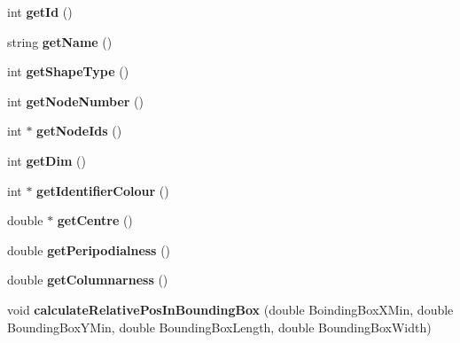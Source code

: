 \begin{DoxyCompactItemize}
\item 
\hypertarget{classShapeBase_ab55ac0089ea8e37649b0d85409c008ac}{}int {\bfseries get\+Id} ()\label{classShapeBase_ab55ac0089ea8e37649b0d85409c008ac}

\item 
\hypertarget{classShapeBase_a49d134532a98fb0cecacec44baf2baf3}{}string {\bfseries get\+Name} ()\label{classShapeBase_a49d134532a98fb0cecacec44baf2baf3}

\item 
\hypertarget{classShapeBase_a7ae6deee4256eb19c6e99b52a40847cb}{}int {\bfseries get\+Shape\+Type} ()\label{classShapeBase_a7ae6deee4256eb19c6e99b52a40847cb}

\item 
\hypertarget{classShapeBase_a46ce732af56537977ce6a34832440309}{}int {\bfseries get\+Node\+Number} ()\label{classShapeBase_a46ce732af56537977ce6a34832440309}

\item 
\hypertarget{classShapeBase_a55c283eaee304f9056089987e9b65012}{}int $\ast$ {\bfseries get\+Node\+Ids} ()\label{classShapeBase_a55c283eaee304f9056089987e9b65012}

\item 
\hypertarget{classShapeBase_ad60d92b34044153a677a8bfc0a31a5df}{}int {\bfseries get\+Dim} ()\label{classShapeBase_ad60d92b34044153a677a8bfc0a31a5df}

\item 
\hypertarget{classShapeBase_af10ec5e87cab16541c892712cf58c54d}{}int $\ast$ {\bfseries get\+Identifier\+Colour} ()\label{classShapeBase_af10ec5e87cab16541c892712cf58c54d}

\item 
\hypertarget{classShapeBase_ab26e6cbde2c8a4f326c32a38de48bcc7}{}double $\ast$ {\bfseries get\+Centre} ()\label{classShapeBase_ab26e6cbde2c8a4f326c32a38de48bcc7}

\item 
\hypertarget{classShapeBase_a90d1eaa5a49262418cee28284da14c16}{}double {\bfseries get\+Peripodialness} ()\label{classShapeBase_a90d1eaa5a49262418cee28284da14c16}

\item 
\hypertarget{classShapeBase_a44c758ac93865a1e51e63212ebfe2787}{}double {\bfseries get\+Columnarness} ()\label{classShapeBase_a44c758ac93865a1e51e63212ebfe2787}

\item 
\hypertarget{classShapeBase_a7d1235b3555a18328d1677e5b07458ff}{}void {\bfseries calculate\+Relative\+Pos\+In\+Bounding\+Box} (double Boinding\+Box\+X\+Min, double Bounding\+Box\+Y\+Min, double Bounding\+Box\+Length, double Bounding\+Box\+Width)\label{classShapeBase_a7d1235b3555a18328d1677e5b07458ff}


\end{DoxyCompactItemize}
